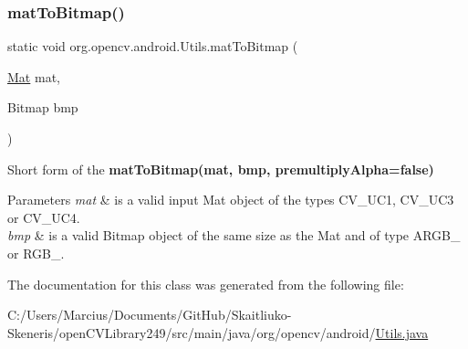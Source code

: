\subsubsection{\texorpdfstring{mat\+To\+Bitmap()}{matToBitmap()}\hspace{0.1cm}{\footnotesize\ttfamily [2/2]}}
{\footnotesize\ttfamily static void org.\+opencv.\+android.\+Utils.\+mat\+To\+Bitmap (\begin{DoxyParamCaption}\item[{\mbox{\hyperlink{classorg_1_1opencv_1_1core_1_1_mat}{Mat}}}]{mat,  }\item[{Bitmap}]{bmp }\end{DoxyParamCaption})\hspace{0.3cm}{\ttfamily [static]}}

Short form of the {\bfseries mat\+To\+Bitmap(mat, bmp, premultiply\+Alpha=false)} 
\begin{DoxyParams}{Parameters}
{\em mat} & is a valid input Mat object of the types \textquotesingle{}C\+V\+\_\+U\+C1\textquotesingle{}, \textquotesingle{}C\+V\+\_\+U\+C3\textquotesingle{} or \textquotesingle{}C\+V\+\_\+U\+C4\textquotesingle{}. \\
\hline
{\em bmp} & is a valid Bitmap object of the same size as the Mat and of type \textquotesingle{}A\+R\+G\+B\+\_\textquotesingle{} or \textquotesingle{}R\+G\+B\+\_\textquotesingle{}. \\
\hline
\end{DoxyParams}


The documentation for this class was generated from the following file\+:\begin{DoxyCompactItemize}
\item 
C\+:/\+Users/\+Marcius/\+Documents/\+Git\+Hub/\+Skaitliuko-\/\+Skeneris/open\+C\+V\+Library249/src/main/java/org/opencv/android/\mbox{\hyperlink{_utils_8java}{Utils.\+java}}\end{DoxyCompactItemize}
